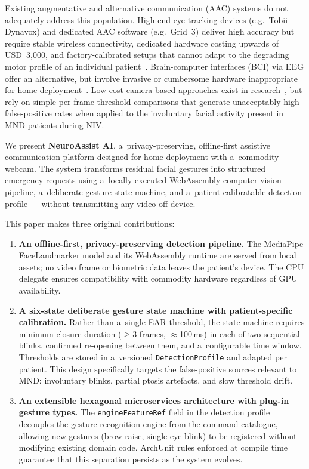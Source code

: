 Existing augmentative and alternative communication (AAC) systems do not adequately
address this population. High-end eye-tracking devices (e.g.\ Tobii Dynavox) and
dedicated AAC software (e.g.\ Grid~3) deliver high accuracy but require stable wireless
connectivity, dedicated hardware costing upwards of USD~3{,}000, and factory-calibrated
setups that cannot adapt to the degrading motor profile of an individual
patient~\cite{beukelman2013aac}. Brain-computer interfaces (BCI) via EEG offer an
alternative, but involve invasive or cumbersome hardware inappropriate for home
deployment~\cite{zander2011passive}. Low-cost camera-based approaches exist in
research~\cite{soukupova2016}, but rely on simple per-frame threshold comparisons that
generate unacceptably high false-positive rates when applied to the involuntary facial
activity present in MND patients during NIV.

We present \textbf{NeuroAssist AI}, a~privacy-preserving, offline-first assistive
communication platform designed for home deployment with a~commodity webcam. The system
transforms residual facial gestures into structured emergency requests using a~locally
executed WebAssembly computer vision pipeline, a~deliberate-gesture state machine, and
a~patient-calibratable detection profile — without transmitting any video off-device.

This paper makes three original contributions:
\begin{enumerate}
  \item \textbf{An offline-first, privacy-preserving detection pipeline.}
    The MediaPipe FaceLandmarker model and its WebAssembly runtime are served from
    local assets; no video frame or biometric data leaves the patient's device.
    The CPU delegate ensures compatibility with commodity hardware regardless of GPU
    availability.

  \item \textbf{A six-state deliberate gesture state machine with patient-specific
    calibration.}
    Rather than a~single EAR threshold, the state machine requires minimum closure
    duration ($\geq$3 frames, ${\approx}$100\,ms) in each of two sequential blinks,
    confirmed re-opening between them, and a~configurable time window. Thresholds are
    stored in a~versioned \texttt{DetectionProfile} and adapted per patient. This design
    specifically targets the false-positive sources relevant to MND: involuntary blinks,
    partial ptosis artefacts, and slow threshold drift.

  \item \textbf{An extensible hexagonal microservices architecture with plug-in gesture
    types.}
    The \texttt{engineFeatureRef} field in the detection profile decouples the gesture
    recognition engine from the command catalogue, allowing new gestures (brow raise,
    single-eye blink) to be registered without modifying existing domain code.
    ArchUnit rules enforced at compile time guarantee that this separation persists as
    the system evolves.
\end{enumerate}

